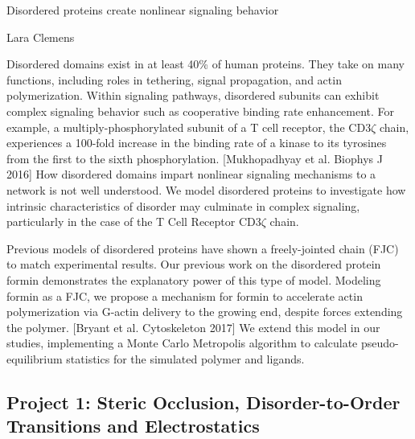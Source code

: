 \documentclass[onecolumn]{article}
\begin{document}
\newcommand{\citel}[1]{\citep{#1}}
\newcommand{\citelt}[1]{\citet{#1}}

\def\Tevac{T_{1/2}^{\mbox{\,\scriptsize evac}}}
\def\Treturn{T_{1/2}^{\mbox{\,\scriptsize return}}}
\def\toffbar{\bar{t}_{\mbox{\scriptsize off}}}
\def\toff{{t}_{\mbox{\scriptsize off}}}
\def\Peclet{P\'{e}clet}


\begin{center}
\Large
Disordered proteins create nonlinear signaling behavior

\large
Lara Clemens
\date{}

\end{center}
\normalsize



Disordered domains exist in at least 40\% of human proteins. They take on many functions, including roles in tethering, signal propagation, and actin polymerization. Within signaling pathways, disordered subunits can exhibit complex signaling behavior such as cooperative binding rate enhancement. For example, a multiply-phosphorylated subunit of a T cell receptor, the CD3$\zeta$ chain, experiences a 100-fold increase in the binding rate of a kinase to its tyrosines from the first to the sixth phosphorylation. [Mukhopadhyay et al. Biophys J 2016] How disordered domains impart nonlinear signaling mechanisms to a network is not well understood. We model disordered proteins to investigate how intrinsic characteristics of disorder may culminate in complex signaling, particularly in the case of the T Cell Receptor CD3$\zeta$ chain. 

Previous models of disordered proteins have shown a freely-jointed chain (FJC) to match experimental results. Our previous work on the disordered protein formin demonstrates the explanatory power of this type of model. Modeling formin as a FJC, we propose a mechanism for formin to accelerate actin polymerization via G-actin delivery to the growing end, despite forces extending the polymer. [Bryant et al. Cytoskeleton 2017] We extend this model in our studies, implementing a Monte Carlo Metropolis algorithm to calculate pseudo-equilibrium statistics for the simulated polymer and ligands. 

\subsection*{Project 1: Steric Occlusion, Disorder-to-Order Transitions and Electrostatics}
\end{document}
